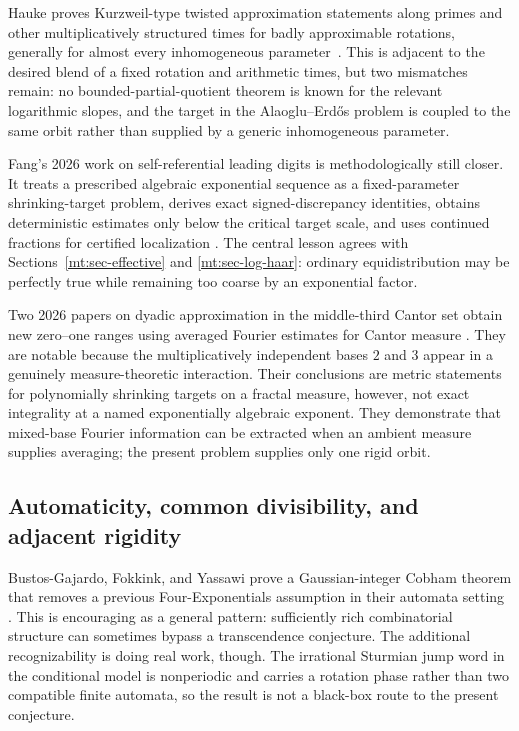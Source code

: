 \documentclass[11pt,oneside]{article}
\theoremstyle{definition}
\theoremstyle{remark}
\begin{document}
Hauke proves Kurzweil-type twisted approximation statements along primes and other
multiplicatively structured times for badly approximable rotations, generally for almost every
inhomogeneous parameter~\cite{Hauke2026}.  This is adjacent to the desired blend of a fixed
rotation and arithmetic times, but two mismatches remain: no bounded-partial-quotient theorem
is known for the relevant logarithmic slopes, and the target in the Alaoglu--Erd\H{o}s problem
is coupled to the same orbit rather than supplied by a generic inhomogeneous parameter.

Fang's 2026 work on self-referential leading digits is methodologically still closer.  It treats
a prescribed algebraic exponential sequence as a fixed-parameter shrinking-target problem,
derives exact signed-discrepancy identities, obtains deterministic estimates only below the
critical target scale, and uses continued fractions for certified localization
\cite{Fang2026}.  The central lesson agrees with Sections~\ref{mt:sec-effective} and
\ref{mt:sec-log-haar}: ordinary equidistribution may be perfectly true while remaining too
coarse by an exponential factor.

Two 2026 papers on dyadic approximation in the middle-third Cantor set obtain new zero--one
ranges using averaged Fourier estimates for Cantor measure
\cite{DaiLiWangWu2026,Bandi2026}.  They are notable because the multiplicatively independent
bases $2$ and $3$ appear in a genuinely measure-theoretic interaction.  Their conclusions are
metric statements for polynomially shrinking targets on a fractal measure, however, not exact
integrality at a named exponentially algebraic exponent.  They demonstrate that mixed-base
Fourier information can be extracted when an ambient measure supplies averaging; the present
problem supplies only one rigid orbit.

\subsection{Automaticity, common divisibility, and adjacent rigidity}

Bustos-Gajardo, Fokkink, and Yassawi prove a Gaussian-integer Cobham theorem that removes a
previous Four-Exponentials assumption in their automata setting
\cite{BustosFokkinkYassawi2026}.  This is encouraging as a general pattern: sufficiently rich
combinatorial structure can sometimes bypass a transcendence conjecture.  The additional
recognizability is doing real work, though.  The irrational Sturmian jump word in the
conditional model is nonperiodic and carries a rotation phase rather than two compatible
finite automata, so the result is not a black-box route to the present conjecture.
\end{document}
